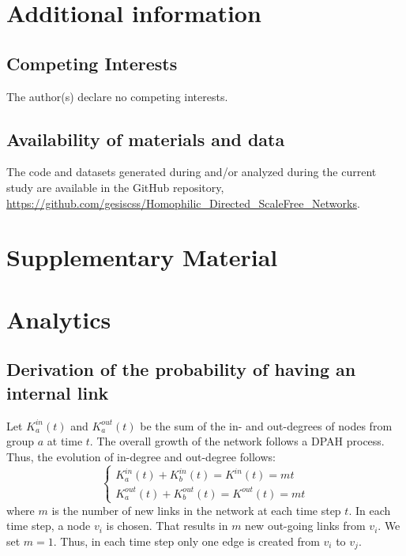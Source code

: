 \documentclass[fleqn,10pt]{wlscirep}
\begin{document}
\section*{Additional information}

\subsection*{Competing Interests}
The author(s) declare no competing interests.

\subsection*{Availability of materials and data}
The code and datasets generated during and/or analyzed during the current study are available in the GitHub repository, \url{https://github.com/gesiscss/Homophilic_Directed_ScaleFree_Networks}.

\clearpage
\setcounter{section}{0}
\setcounter{equation}{0}
\setcounter{table}{0}
\setcounter{figure}{0}
\renewcommand{\thetable}{S\arabic{table}}
\renewcommand{\thefigure}{S\arabic{figure}}

\section*{Supplementary Material}
\appendix
\section{Analytics}
\label{sm:analytics}
\subsection{Derivation of the probability of having an internal link}
\label{sup:probability}

Let $K^{in}_a(t)$ and $K^{out}_a(t)$ be the sum of the in- and out-degrees of nodes from group $a$ at time $t$. The overall growth of the network follows a DPAH process. %
Thus, the evolution of in-degree and out-degree follows:
\begin{equation}\label{req:kakb}
\left\{
  \begin{array}{l}
K_a^{in}(t) + K_b^{in}(t) = K^{in}(t) = m t %
\\
K_a^{out}(t) + K_b^{out}(t) = K^{out}(t) = m t %
  \end{array}
\right.
\end{equation}
where $m$ is the number of new links in the network at each time step $t$. In each time step, a node $v_i$ is chosen. That results in $m$ new out-going links from $v_i$. %
We set $m=1$. Thus, in each time step only one edge is created from $v_i$ to $v_j$.
\end{document}
